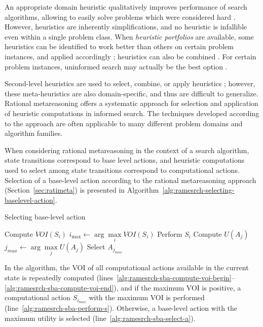 An appropriate domain heuristic qualitatively improves performance of
search algorithms, allowing to easily solve problems which were
considered hard \cite{Allen.selheur}. However, heuristics are
inherently simplifications, and no heuristic is infallible even within
a single problem class. When {\em heuristic portfolios} are available,
some heuristics can be identified to work better than others on
certain problem instances, and applied accordingly
\cite{Allen.selheur}; heuristics can also be combined
\cite{Domshlak.maxornot}. For certain problem instances, uninformed
search may actually be the best option \cite{Kask.solcount}.

Second-level heuristics are used to select, combine, or apply
heuristics \cite{Allen.selheur}\cite{Bulitko.dynamiccontrol}; however,
these meta-heuristics are also domain-specific, and thus are difficult
to generalize. Rational metareasoning offers a systematic approach for
selection and application of heuristic computations in informed search. The
techniques developed according to the approach are often applicable to
many different problem domains and algorithm families.

When considering rational metareasoning in the context of a search
algorithm, state transitions correspond to base level actions, and
heuristic computations used to select among state transitions
correspond to computational actions. Selection of a base-level action
according to the rational metareasoning approach
(Section~\ref{sec:ratimeta}) is presented in
Algorithm~\ref{alg:ramesrch-selecting-baselevel-action}.
\begin{algorithm}
  \caption{Selecting base-level action}
  \label{alg:ramesrch-selecting-baselevel-action}
  \begin{algorithmic}[1]
    \Loop                                    \label{alg:ramesrch-sba-compute-voi-begin}
        \State Compute $VOI(S_i)$            \label{alg:ramesrch-sba-compute-voi}
      \EndFor
      \State $i_{\max} \leftarrow \arg \max\limits_i VOI(S_i)$
         \State Perform $S_i$                \label{alg:ramesrch-sba-perform-s}
      \Else
      \EndIf
    \EndLoop                                 \label{alg:ramesrch-sba-compute-voi-end}
       \State Compute $U(A_j)$
    \EndFor
    \State $j_{max} \leftarrow \arg \max \limits_j U(A_j)$
    \State Select $A_{j_{max}}$              \label{alg:ramesrch-sba-select-a}
  \end{algorithmic}
\end{algorithm}
In the algorithm, the VOI of all computational actions available in
the current state is repeatedly computed
(lines~\ref{alg:ramesrch-sba-compute-voi-begin}--\ref{alg:ramesrch-sba-compute-voi-end}),
and if the maximum VOI is positive, a computational action
$S_{i_{max}}$ with the maximum VOI is performed
(line~\ref{alg:ramesrch-sba-perform-s}). Otherwise, a base-level
action with the maximum utility is selected
(line~\ref{alg:ramesrch-sba-select-a}).

